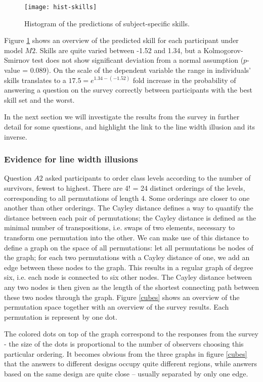\begin{figure}
\centering \texttt{[image: hist-skills]}
\caption{\label{skills}Histogram of the predictions of subject-specific skills. }
\end{figure}	
Figure \ref{skills} shows an overview of the predicted skill for each participant under model $M2$. Skills are quite varied between  -1.52 and  1.34, but
a Kolmogorov-Smirnov test  does not show significant deviation from a normal assumption ($p$-value = 0.089).
On the scale of the dependent variable the range in individuals' skills translates to a $17.5 = e^{1.34 - (-1.52)}$ fold increase in the probability of answering a question on the survey correctly between participants with the best skill set and the worst.

In the next section we will investigate the results from the survey in further detail for some questions, and highlight the link to the line width illusion and its inverse.

\subsubsection{Evidence for line width illusions}

Question $A2$ asked participants to order  class levels  according to the number of survivors, fewest to highest. There are 4! = 24 distinct orderings of the levels, corresponding to all permutations of length 4. Some orderings are closer to one another than other orderings. The Cayley distance defines a way to quantify the distance between  each pair of permutations; the Cayley distance is defined as the minimal number of transpositions, i.e. swaps of two elements,  necessary to transform one permutation into the other.
We can make use of this distance to define a graph on the space of all permutations: let all permutations be nodes of the graph; for each two permutations with a Cayley distance of one, we add an edge between these nodes to the graph. This results in a regular graph of degree six, i.e. each  node is connected to six other nodes. The Cayley distance between any two nodes is then given as the length of the shortest connecting path between these two nodes through the graph.
Figure \ref{cubes} shows an overview of the permutation space together with an overview of the survey results. Each permutation is represent by one dot. 

The colored dots on top of the graph correspond to the responses from the survey - the size of the dots is proportional to the number of observers choosing this particular ordering. It becomes obvious from the three graphs in figure \ref{cubes} that
the answers to different designs occupy quite different regions, while answers based  on the same design are quite close --  usually separated by only one edge. 

